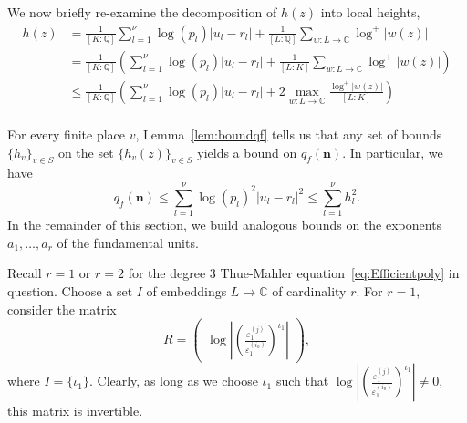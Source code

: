 \documentclass[11pt]{report}
\theoremstyle{definition}
\begin{document}

We now briefly re-examine the decomposition of $h(z)$ into local heights,
\begin{align*}
  h(z) & = \frac{1}{[K:\mathbb{Q}]}\sum_{l = 1}^{\nu} \log(p_l)|u_l - r_l| +
         \frac{1}{[L:\mathbb{Q}]}\sum_{w :L \to \mathbb{C}} \log^+|w(z)|\\
       & = \frac{1}{[K:\mathbb{Q}]}\left(\sum_{l = 1}^{\nu} \log(p_l)|u_l - r_l| +
         \frac{1}{[L:K]}\sum_{w :L \to \mathbb{C}} \log^+|w(z)|\right)\\
       & \leq \frac{1}{[K:\mathbb{Q}]}\left(\sum_{l = 1}^{\nu} \log(p_l)|u_l - r_l| +
         2\max_{w :L \to \mathbb{C}} \frac{\log^+|w(z)|}{[L:K]}\right)\\
\end{align*}

For every finite place $v$, Lemma~\ref{lem:boundqf} tells us that any set of bounds $\{h_v\}_{v \in S}$ on the set $\{h_v(z)\}_{v \in S}$ yields a bound on $q_f(\mathbf{n})$. In particular, we have
\[ q_f(\mathbf{n}) \leq \sum_{l = 1}^{\nu}\log(p_l)^2|u_l -r_l|^2 \leq \sum_{l = 1}^{\nu} h_l^2.\]
In the remainder of this section, we build analogous bounds on the exponents $a_1, \dots, a_r$ of the fundamental units.

Recall $r = 1$ or $r = 2$ for the degree $3$ Thue-Mahler equation~\eqref{eq:Efficientpoly} in question. Choose a set $I$ of embeddings $L \rightarrow \mathbb{C}$ of cardinality $r$. For $r = 1$, consider the matrix
\[R = \begin{pmatrix}
	\log\left|\left(\frac{\varepsilon_1^{(j)}}{\varepsilon_1^{(i_0)}}\right)^{\iota_1}\right| \end{pmatrix},\]
where $I = \{\iota_1\}$. Clearly, as long as we choose $\iota_1$ such that $\log\left|\left(\frac{\varepsilon_1^{(j)}}{\varepsilon_1^{(i_0)}}\right)^{\iota_1}\right| \neq 0$, this matrix is invertible.
\end{document}

